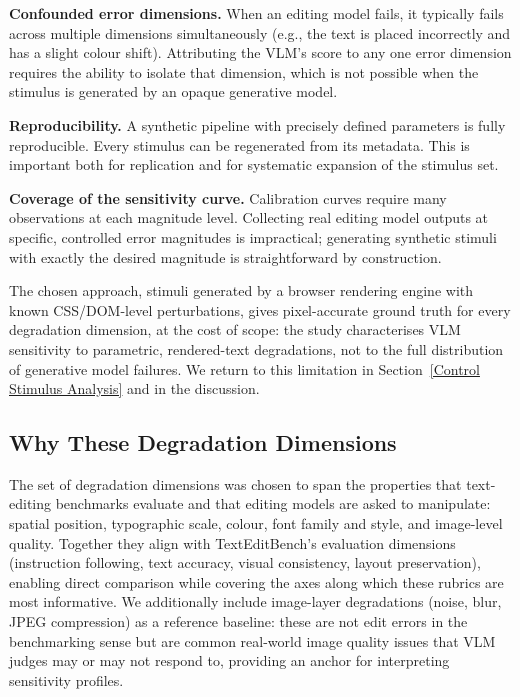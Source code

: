 \textbf{Confounded error dimensions.} When an editing model fails, it typically fails across multiple dimensions simultaneously (e.g., the text is placed incorrectly and has a slight colour shift). Attributing the VLM's score to any one error dimension requires the ability to isolate that dimension, which is not possible when the stimulus is generated by an opaque generative model.

\textbf{Reproducibility.} A synthetic pipeline with precisely defined parameters is fully reproducible. Every stimulus can be regenerated from its metadata. This is important both for replication and for systematic expansion of the stimulus set.

\textbf{Coverage of the sensitivity curve.} Calibration curves require many observations at each magnitude level. Collecting real editing model outputs at specific, controlled error magnitudes is impractical; generating synthetic stimuli with exactly the desired magnitude is straightforward by construction.

The chosen approach, stimuli generated by a browser rendering engine with known CSS/DOM-level perturbations, gives pixel-accurate ground truth for every degradation dimension, at the cost of scope: the study characterises VLM sensitivity to parametric, rendered-text degradations, not to the full distribution of generative model failures. We return to this limitation in Section~\ref{Control Stimulus Analysis} and in the discussion.

\subsection{Why These Degradation Dimensions}

The set of degradation dimensions was chosen to span the properties that text-editing benchmarks evaluate and that editing models are asked to manipulate: spatial position, typographic scale, colour, font family and style, and image-level quality. Together they align with TextEditBench's evaluation dimensions (instruction following, text accuracy, visual consistency, layout preservation), enabling direct comparison while covering the axes along which these rubrics are most informative. We additionally include image-layer degradations (noise, blur, JPEG compression) as a reference baseline: these are not edit errors in the benchmarking sense but are common real-world image quality issues that VLM judges may or may not respond to, providing an anchor for interpreting sensitivity profiles.


